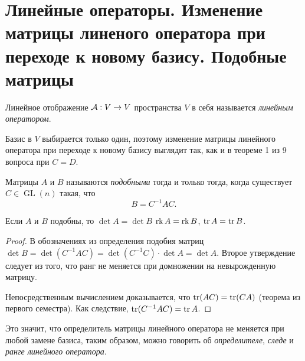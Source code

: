 \section{Линейные операторы. Изменение матрицы линеного оператора при переходе к новому базису. Подобные матрицы}

\begin{definition}
    Линейное отображение $\mathcal{A}: V \to V$ пространства $V$ в себя называется \textit{линейным оператором}.
\end{definition}

Базис в $V$ выбирается только один, поэтому изменение матрицы линейного оператора при переходе к новому базису выглядит так, как и в теореме 1 из 9 вопроса при $C = D$.

\begin{definition}
    Матрицы $A$ и $B$ называются \textit{подобными} тогда и только тогда, когда существует $C \in \operatorname{GL}(n)$ такая, что
    \[
        B = C^{-1}AC.
    \]
\end{definition}

\begin{proposal}
    Если $A$ и $B$ подобны, то $\det A = \det B$ $\operatorname{rk} A = \operatorname{rk} B$, $\operatorname{tr} A = \operatorname{tr} B$.
\end{proposal}

\begin{proof}
    В обозначениях из определения подобия матриц $\det B = \det(C^{-1}AC) = \det(C^{-1}C) \cdot \det A = \det A$. Второе утверждение следует из того, что ранг не меняется при домножении на невырожденную матрицу.

    Непосредственным вычислением доказывается, что $\operatorname{tr}(AC) = \operatorname{tr}(CA)$ (теорема из первого семестра). Как следствие, $\operatorname{tr}(C^{-1}AC) = \operatorname{tr} A$.
\end{proof}

Это значит, что определитель матрицы линейного оператора не меняется при любой замене базиса, таким образом, можно говорить об \textit{определителе}, \textit{следе} и \textit{ранге линейного оператора}.

